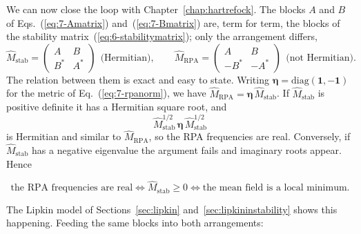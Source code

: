 We can now close the loop with Chapter~\ref{chap:hartrefock}.  The blocks $A$
and $B$ of Eqs.~(\ref{eq:7-Amatrix}) and~(\ref{eq:7-Bmatrix}) are, term for
term, the blocks of the stability matrix~(\ref{eq:6-stabilitymatrix}); only
the arrangement differs,
\begin{equation}
  \hat{M}_{\mathrm{stab}} =
  \begin{pmatrix} A & B\\ B^{*} & A^{*}\end{pmatrix}
  \ \ \text{(Hermitian)},
  \qquad
  \hat{M}_{\mathrm{RPA}} =
  \begin{pmatrix} A & B\\ -B^{*} & -A^{*}\end{pmatrix}
  \ \ \text{(not Hermitian)} .
  \label{eq:7-twoarrangements}
\end{equation}
The relation between them is exact and easy to state.  Writing
$\bm{\eta}=\mathrm{diag}(\bm{1},-\bm{1})$ for the metric of
Eq.~(\ref{eq:7-rpanorm}), we have
$\hat{M}_{\mathrm{RPA}}=\bm{\eta}\,\hat{M}_{\mathrm{stab}}$.  If
$\hat{M}_{\mathrm{stab}}$ is positive definite it has a Hermitian square root,
and
\begin{equation}
  \hat{M}_{\mathrm{stab}}^{1/2}\,\bm{\eta}\,\hat{M}_{\mathrm{stab}}^{1/2}
  \label{eq:7-similarity}
\end{equation}
is Hermitian and similar to $\hat{M}_{\mathrm{RPA}}$, so the RPA frequencies
are real.  Conversely, if $\hat{M}_{\mathrm{stab}}$ has a negative
eigenvalue the argument fails and imaginary roots appear.  Hence

\begin{equation}
  \boxed{\;
  \text{the RPA frequencies are real}
  \iff
  \hat{M}_{\mathrm{stab}}\ge0
  \iff
  \text{the mean field is a local minimum.}
  \;}
  \label{eq:7-stabilityequivalence}
\end{equation}

The Lipkin model of Sections~\ref{sec:lipkin} and~\ref{sec:lipkininstability}
shows this happening.  Feeding the same blocks into both arrangements:

